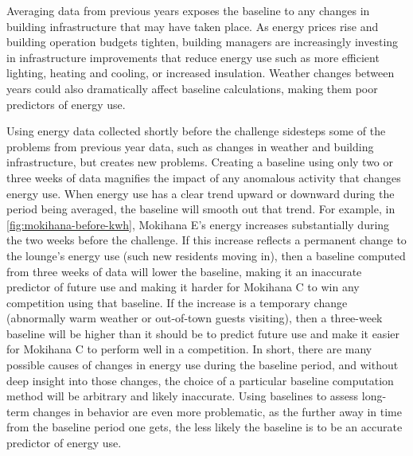 Averaging data from previous years exposes the baseline to any changes in building infrastructure that may have taken place. As energy prices rise and building operation budgets tighten, building managers are increasingly investing in infrastructure improvements that reduce energy use such as more efficient lighting, heating and cooling, or increased insulation. Weather changes between years could also dramatically affect baseline calculations, making them poor predictors of energy use.

Using energy data collected shortly before the challenge sidesteps some of the problems from previous year data, such as changes in weather and building infrastructure, but creates new problems. Creating a baseline using only two or three weeks of data magnifies the impact of any anomalous activity that changes energy use. When energy use has a clear trend upward or downward during the period being averaged, the baseline will smooth out that trend. For example, in \autoref{fig:mokihana-before-kwh}, Mokihana E's energy increases substantially during the two weeks before the challenge. If this increase reflects a permanent change to the lounge's energy use (such new residents moving in), then a baseline computed from three weeks of data will lower the baseline, making it an inaccurate predictor of future use and making it harder for Mokihana C to win any competition using that baseline. If the increase is a temporary change (abnormally warm weather or out-of-town guests visiting), then a three-week baseline will be higher than it should be to predict future use and make it easier for Mokihana C to perform well in a competition. In short, there are many possible causes of changes in energy use during the baseline period, and without deep insight into those changes, the choice of a particular baseline computation method will be arbitrary and likely inaccurate. Using baselines to assess long-term changes in behavior are even more problematic, as the further away in time from the baseline period one gets, the less likely the baseline is to be an accurate predictor of energy use.

